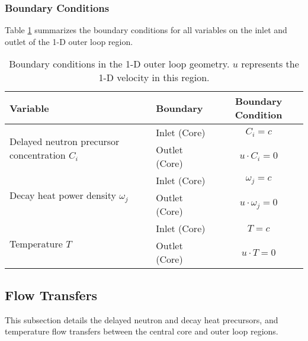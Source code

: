 \subsubsection{Boundary Conditions}

Table \ref{table:loopbc} summarizes the boundary conditions for all variables
on the inlet and outlet of the 1-D outer loop region.

\begin{table}[htbp!]
    \small
	\caption{Boundary conditions in the 1-D outer loop geometry. $u$
	represents the 1-D velocity in this region.}
	\centering
	\begin{tabular}{ l l c}
		\toprule
		Variable & Boundary & Boundary Condition \\
        \midrule
        \multirow{2}{*}{Delayed neutron precursor concentration $C_i$} &
        Inlet (Core) & $C_i = c$ \\
        & Outlet (Core) & $u \cdot C_i = 0$ \\
        \midrule
        \multirow{2}{*}{Decay heat power density $\omega_j$} &
        Inlet (Core) & $\omega_j = c$ \\
        & Outlet (Core) & $u \cdot \omega_j = 0$ \\
        \midrule
        \multirow{2}{*}{Temperature $T$} &
        Inlet (Core) & $T = c$ \\
        & Outlet (Core) & $u \cdot T = 0$ \\
		\bottomrule
	\end{tabular}
	\label{table:loopbc}
\end{table}

\subsection{Flow Transfers}

This subsection details the delayed neutron and decay heat precursors, and
temperature flow transfers between the central core and outer loop regions. 


